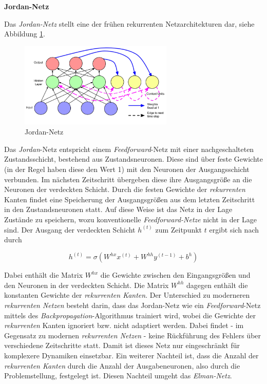 \textbf{Jordan-Netz}

Das \textit{Jordan-Netz} stellt eine der frühen rekurrenten Netzarchitekturen dar, siehe Abbildung \ref{fig:jordan}. 

\begin{figure} [h]
	\centering
	\includegraphics[width=0.65\textwidth]{images/jordan}
	\caption{Jordan-Netz \cite{Lipton.5292015}}
	\label{fig:jordan}
\end{figure}


Das \textit{Jordan}-Netz entspricht einem \textit{Feedforward}-Netz mit einer nachgeschalteten Zustandsschicht, bestehend aus Zustandsneuronen. Diese sind über feste Gewichte (in der Regel haben diese den Wert 1) mit den Neuronen der Ausgangsschicht verbunden. Im nächsten Zeitschritt übergeben diese ihre Ausgangsgröße an die Neuronen der verdeckten Schicht. Durch die festen Gewichte der \textit{rekurrenten} Kanten findet eine Speicherung der Ausgangsgrößen aus dem letzten Zeitschritt in den Zustandsneuronen statt. Auf diese Weise ist das Netz in der Lage Zustände zu speichern, wozu konventionelle \textit{Feedforward-Netze} nicht in der Lage sind. Der Ausgang der verdeckten Schicht $h^{(t)}$ zum Zeitpunkt $t$ ergibt sich nach \cite{Jordan.1997} durch

\begin{equation}
h^{(t)} = \sigma(W^{hx}x^{(t)} + W^{hh}y^{(t-1)} + b^{h})
\end{equation}

Dabei enthält die Matrix $W^{hx}$ die Gewichte zwischen den Eingangsgrößen und den Neuronen in der verdeckten Schicht. Die Matrix $W^{hh}$ dagegen enthält die konstanten Gewichte der \textit{rekurrenten Kanten}. Der Unterschied zu moderneren \textit{rekurrenten Netzen} besteht darin, dass das Jordan-Netz wie ein \textit{Feedforward}-Netz mittels des \textit{Backpropagation}-Algorithmus trainiert wird, wobei die Gewichte der \textit{rekurrenten} Kanten ignoriert bzw. nicht adaptiert werden. Dabei findet - im Gegensatz zu modernen \textit{rekurrenten Netzen} - keine Rückführung des Fehlers über verschiedene Zeitschritte statt. Damit ist dieses Netz nur eingeschränkt für komplexere Dynamiken einsetzbar. Ein weiterer Nachteil ist, dass die Anzahl der \textit{rekurrenten Kanten} durch die Anzahl der Ausgabeneuronen, also durch die Problemstellung, festgelegt ist. Diesen Nachteil umgeht das \textit{Elman-Netz}.

